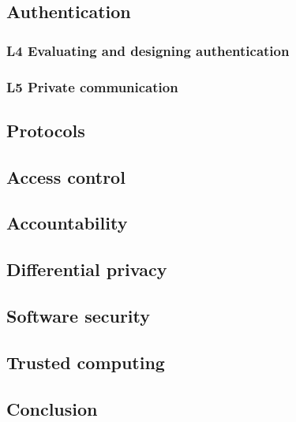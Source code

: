 {\subsection{Authentication}%
\label{authentication}


\subsubsection{L4 Evaluating and designing authentication}%
\label{pwdeval}


\subsubsection{L5 Private communication}%
\label{pricomlab}


\subsection{Protocols}%
\label{protocols}


\subsection{Access control}%
\label{ac}


\subsection{Accountability}%
\label{accountability}


\subsection{Differential privacy}%
\label{diffpriv}


\subsection{Software security}%
\label{software}


\subsection{Trusted computing}%
\label{trustcomp}


\subsection{Conclusion}%
\label{conclusion}

}
